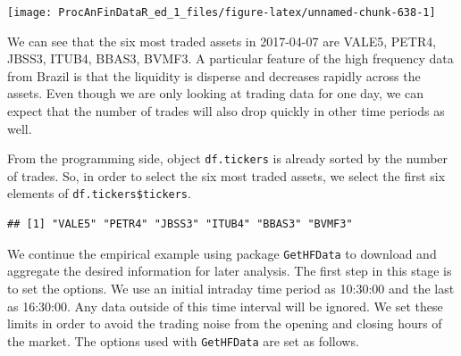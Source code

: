 \documentclass[11pt,]{book}
\newenvironment{Shaded}{\begin{snugshade}}{\end{snugshade}}
\newcommand{\KeywordTok}[1]{\textcolor[rgb]{0.27,0.27,0.27}{\textbf{#1}}}
\newcommand{\DecValTok}[1]{\textcolor[rgb]{0.06,0.06,0.06}{#1}}
\newcommand{\StringTok}[1]{\textcolor[rgb]{0.5,0.5,0.5}{#1}}
\newcommand{\CommentTok}[1]{\textcolor[rgb]{0.56,0.35,0.01}{\textit{#1}}}
\newcommand{\OperatorTok}[1]{\textcolor[rgb]{0.81,0.36,0.00}{\textbf{#1}}}
\newcommand{\NormalTok}[1]{#1}
\begin{document}
\begin{center}\texttt{[image: ProcAnFinDataR\_ed\_1\_files/figure-latex/unnamed-chunk-638-1]} \end{center}

We can see that the six most traded assets in 2017-04-07 are VALE5,
PETR4, JBSS3, ITUB4, BBAS3, BVMF3. A particular feature of the high
frequency data from Brazil is that the liquidity is disperse and
decreases rapidly across the assets. Even though we are only looking at
trading data for one day, we can expect that the number of trades will
also drop quickly in other time periods as well.

From the programming side, object \texttt{df.tickers} is already sorted
by the number of trades. So, in order to select the six most traded
assets, we select the first six elements of
\texttt{df.tickers\$tickers}.

\begin{Shaded}
\end{Shaded}

\begin{verbatim}
## [1] "VALE5" "PETR4" "JBSS3" "ITUB4" "BBAS3" "BVMF3"
\end{verbatim}

We continue the empirical example using package \texttt{GetHFData} to
download and aggregate the desired information for later analysis. The
first step in this stage is to set the options. We use an initial
intraday time period as 10:30:00 and the last as 16:30:00. Any data
outside of this time interval will be ignored. We set these limits in
order to avoid the trading noise from the opening and closing hours of
the market. The options used with \texttt{GetHFData} are set as follows.

\begin{Shaded}
\end{Shaded}
\end{document}
